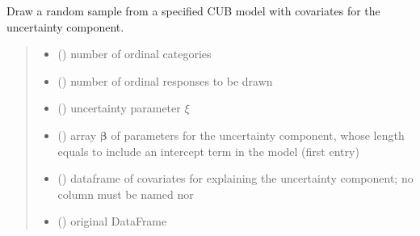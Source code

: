 \documentclass[letterpaper,10pt,english]{sphinxmanual}
\begin{document}
\begin{fulllineitems}
\label{\detokenize{cubmods:cubmods.cub_y0.draw}}
\pysigstartsignatures
{}
\pysigstopsignatures
\sphinxAtStartPar
Draw a random sample from a specified CUB model with covariates for
the uncertainty component.
\begin{quote}\begin{description}
\begin{itemize}
\item {} 
\sphinxAtStartPar
{} () \textendash{} number of ordinal categories

\item {} 
\sphinxAtStartPar
{} () \textendash{} number of ordinal responses to be drawn

\item {} 
\sphinxAtStartPar
{} () \textendash{} uncertainty parameter \(\xi\)

\item {} 
\sphinxAtStartPar
{} () \textendash{} array \(\pmb \beta\) of parameters for the uncertainty component, whose length equals 
 to include an intercept term in the model (first entry)

\item {} 
\sphinxAtStartPar
{} () \textendash{} dataframe of covariates for explaining the uncertainty component;
no column must be named  nor 

\item {} 
\sphinxAtStartPar
{} () \textendash{} original DataFrame


\end{itemize}
\end{description}
\end{quote}
\end{fulllineitems}
\end{document}

